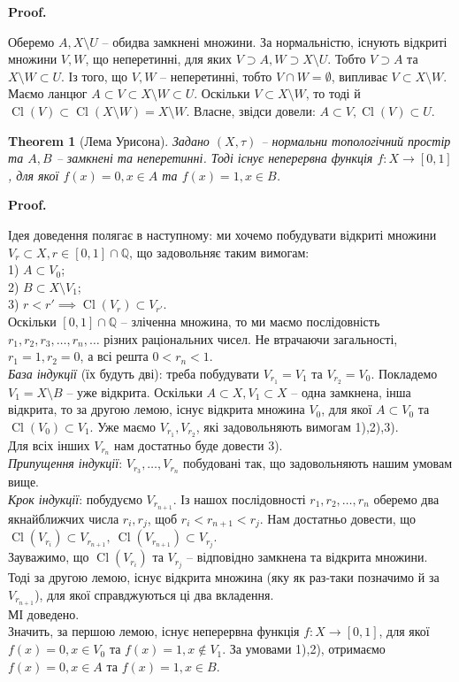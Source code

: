 \documentclass[a4paper, 10pt]{article}
\makeatletter
\theoremstyle{theoremdd}
\newtheorem{theorem}{Theorem}[subsection]
\DeclareMathOperator{\Cl}{Cl}
\renewenvironment{proof}[1][Proof.\\]{\par
\pushQED{\hfill \qed}%
\normalfont \topsep6\p@\@plus6\p@\relax
\trivlist
\item\relax
{\bfseries
#1\@addpunct{.}}\hspace\labelsep\ignorespaces
}{%
\popQED\endtrivlist\@endpefalse
}
\makeatother
\begin{document}
\begin{proof}
Оберемо $A, X \setminus U$ -- обидва замкнені множини. За нормальністю, існують відкриті множини $V,W$, що неперетинні, для яких $V \supset A, W \supset X \setminus U$. Тобто $V \supset A$ та $X \setminus W \subset U$. Із того, що $V,W$ -- неперетинні, тобто $V \cap W = \emptyset$, випливає $V \subset X \setminus W$. Маємо ланцюг $A \subset V \subset X \setminus W \subset U$. Оскільки $V \subset X \setminus W$, то тоді й $\Cl(V) \subset \Cl(X \setminus W) = X \setminus W$. Власне, звідси довели: $A \subset V, \Cl(V) \subset U$.
\end{proof}

\begin{theorem}[Лема Урисона]
Задано $(X,\tau)$ -- нормальни топологічний простір та $A,B$ -- замкнені та неперетинні. Тоді існує неперервна функція $f \colon X \to [0,1]$, для якої $f(x) = 0, x \in A$ та $f(x) = 1, x \in B$.
\end{theorem}

\begin{proof}
Ідея доведення полягає в наступному: ми хочемо побудувати відкриті множини $V_r \subset X, r \in [0,1] \cap \mathbb{Q}$, що задовольняє таким вимогам:\\
1) $A \subset V_0$;\\
2) $B \subset X \setminus V_1$;\\
3) $r < r' \implies \Cl(V_r) \subset V_{r'}$.\\
Оскільки $[0,1] \cap \mathbb{Q}$ -- зліченна множина, то ми маємо послідовність $r_1,r_2,r_3,\dots,r_n,\dots$ різних раціональних чисел. Не втрачаючи загальності, $r_1 = 1, r_2 = 0$, а всі решта $0 < r_n < 1$.\\
\textit{База індукції} (їх будуть дві): треба побудувати $V_{r_1} = V_1$ та $V_{r_2} = V_0$. Покладемо $V_1 = X \setminus B$ -- уже відкрита. Оскільки $A \subset X, V_1 \subset X$ -- одна замкнена, інша відкрита, то за другою лемою, існує відкрита множина $V_0$, для якої $A \subset V_0$ та $\Cl(V_0) \subset V_1$. Уже маємо $V_{r_1},V_{r_2}$, які задовольняють вимогам 1),2),3).\\
Для всіх інших $V_{r_n}$ нам достатньо буде довести 3).\\
\textit{Припущення індукції}: $V_{r_3},\dots,V_{r_n}$ побудовані так, що задовольняють нашим умовам вище.\\
\textit{Крок індукції}: побудуємо $V_{r_{n+1}}$. Із нашох послідовності $r_1,r_2,\dots,r_n$ оберемо два якнайближчих числа $r_i,r_j$, щоб $r_i < r_{n+1} < r_j$. Нам достатньо довести, що $\Cl(V_{r_i}) \subset V_{r_{n+1}},\ \Cl(V_{r_{n+1}}) \subset V_{r_j}$.\\
Зауважимо, що $\Cl(V_{r_i})$ та $V_{r_j}$ -- відповідно замкнена та відкрита множини. Тоді за другою лемою, існує відкрита множина (яку як раз-таки позначимо й за $V_{r_{n+1}}$), для якої справджуються ці два вкладення. \\
МІ доведено.\\
Значить, за першою лемою, існує неперервна функція $f \colon X \to [0,1]$, для якої $f(x) = 0, x \in V_0$ та $f(x) = 1, x \notin V_1$. За умовами 1),2), отримаємо $f(x) = 0, x \in A$ та $f(x) = 1, x \in B$.
\end{proof}
\end{document}

